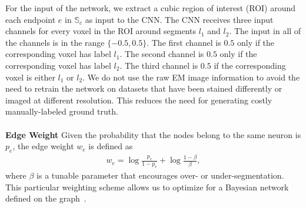 For the input of the network, we extract a cubic region of interest (ROI) around each endpoint $e$ in $\mathbb{S}_c$ as input to the CNN. 
The CNN receives three input channels for every voxel in the ROI around segments $l_1$ and $l_2$. 
The input in all of the channels is in the range $\{-0.5, 0.5\}$. 
The first channel is $0.5$ only if the corresponding voxel has label $l_1$. 
The second channel is $0.5$ only if the corresponding voxel has label $l_2$. 
The third channel is $0.5$ if the corresponding voxel is either $l_1$ or $l_2$.
We do not use the raw EM image information to avoid the need to retrain the network on datasets that have been stained differently or imaged at different resolution. 
This reduces the need for generating costly manually-labeled ground truth. 
\\~\\
\noindent\textbf{Edge Weight} Given the probability that the nodes belong to the same neuron is $p_e$, the edge weight $w_e$ is defined as
\begin{align}
w_e = \log{\frac{p_e}{1 - p_e}} + \log{\frac{1 - \beta}{\beta}},
\end{align}
where $\beta$ is a tunable parameter that encourages over- or under-segmentation. 
This particular weighting scheme allows us to optimize for a Bayesian network defined on the graph~\cite{keuper2015efficient,andres2011probabilistic}.



